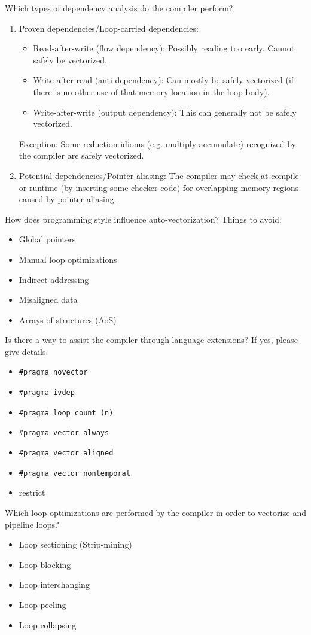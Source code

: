 \begin{frame}{Which types of dependency analysis do the compiler perform?}
\begin{enumerate}
\item Proven dependencies/Loop-carried dependencies:
\begin{itemize}
\item Read-after-write (flow dependency): Possibly reading too early. Cannot safely be vectorized.
\item Write-after-read (anti dependency): Can mostly be safely vectorized (if there is no other use of that memory location in the loop body).
\item Write-after-write (output dependency): This can generally not be safely vectorized.
\end{itemize}
Exception: Some reduction idioms (e.g. multiply-accumulate) recognized by the compiler are safely vectorized.
\item Potential dependencies/Pointer aliasing:
The compiler may check at compile or runtime (by inserting some checker code) for overlapping memory regions caused by pointer aliasing.
\end{enumerate}
\end{frame}

\begin{frame}{How does programming style influence auto-vectorization?}
Things to avoid:
\begin{itemize}
	\item Global pointers
	\item Manual loop optimizations
	\item Indirect addressing
	\item Misaligned data
	\item Arrays of structures (AoS)
\end{itemize}
\end{frame}

\begin{frame}{Is there a way to assist the compiler through language extensions? If yes, please give details.}
\begin{itemize}
\item \texttt{\#pragma novector}
\item \texttt{\#pragma ivdep}
\item \texttt{\#pragma loop count (n)}
\item \texttt{\#pragma vector always}
\item \texttt{\#pragma vector aligned}
\item \texttt{\#pragma vector nontemporal}
\item restrict
\end{itemize}
\end{frame}

\begin{frame}{Which loop optimizations are performed by the compiler in order to vectorize and pipeline loops?}
\begin{itemize}
\item Loop sectioning (Strip-mining)
\item Loop blocking
\item Loop interchanging
\item Loop peeling
\item Loop collapsing
\end{itemize}
\end{frame}
